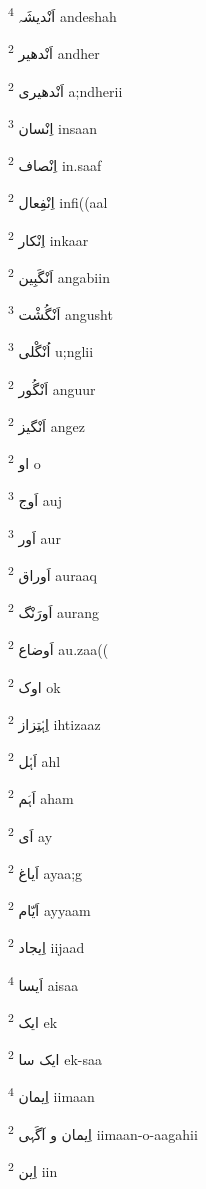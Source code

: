 \documentclass[12pt]{article}
\begin{document}
\begin{multicols}{5}
{\ur اَنْدیشَہ}   \textsuperscript{4} andeshah

{\ur اَنْدھیر}   \textsuperscript{2} andher

{\ur اَنْدھیری}   \textsuperscript{2} a;ndherii

{\ur اِنْسان}   \textsuperscript{3} insaan

{\ur اِنْصاف}   \textsuperscript{2} in.saaf

{\ur اِنْفِعال}   \textsuperscript{2} infi((aal

{\ur اِنْکار}   \textsuperscript{2} inkaar

{\ur اَنْگَبِین}   \textsuperscript{2} angabiin

{\ur اَنْگُشْت}   \textsuperscript{3} angusht

{\ur اُنْگْلی}   \textsuperscript{3} u;nglii

{\ur اَنْگُور}   \textsuperscript{2} anguur

{\ur اَنْگیز}   \textsuperscript{2} angez

{\ur او}   \textsuperscript{2} o

{\ur اَوج}   \textsuperscript{3} auj

{\ur اَور}   \textsuperscript{3} aur

{\ur اَوراق}   \textsuperscript{2} auraaq

{\ur اَورَنْگ}   \textsuperscript{2} aurang

{\ur اَوضاع}   \textsuperscript{2} au.zaa((

{\ur اوک}   \textsuperscript{2} ok

{\ur اِہْتِزاز}   \textsuperscript{2} ihtizaaz

{\ur اَہْل}   \textsuperscript{2} ahl

{\ur اَہَم}   \textsuperscript{2} aham

{\ur اَی}   \textsuperscript{2} ay

{\ur اَیاغ}   \textsuperscript{2} ayaa;g

{\ur اَیّام}   \textsuperscript{2} ayyaam

{\ur اِیجاد}   \textsuperscript{2} iijaad

{\ur اَیسا}   \textsuperscript{4} aisaa

{\ur ایک}   \textsuperscript{2} ek

{\ur ایک سا}   \textsuperscript{2} ek-saa

{\ur اِیمان}   \textsuperscript{4} iimaan

{\ur اِیمان و آگَہی}   \textsuperscript{2} iimaan-o-aagahii

{\ur اِین}   \textsuperscript{2} iin


\end{multicols}
\end{document}
